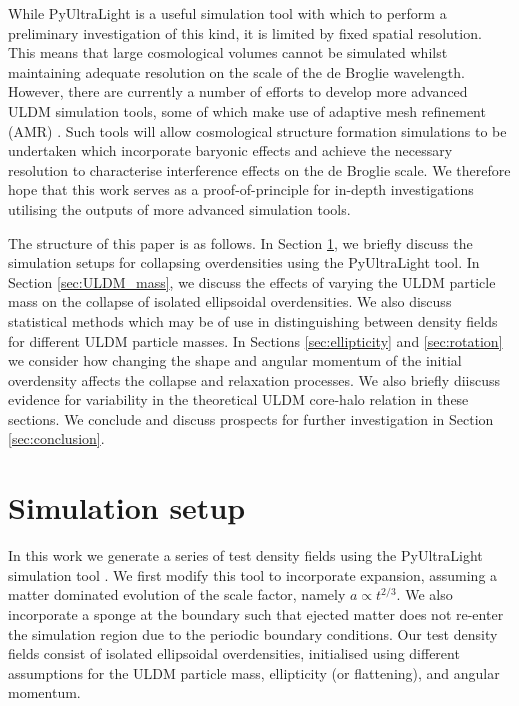 \documentclass[a4paper,11pt]{article}
\begin{document}
While {\sc PyUltraLight} is a useful simulation tool with which to perform a preliminary investigation of this kind, it is limited by fixed spatial resolution. This means that large cosmological volumes cannot be simulated whilst maintaining adequate resolution on the scale of the de Broglie wavelength. However, there are currently a number of efforts to develop more advanced ULDM simulation tools, some of which make use of adaptive mesh refinement (AMR) \cite{Mocz:2019emo, Niemeyer:2019aqm, Veltmaat:2019hou, Schwabe:2020eac}. Such tools will allow cosmological structure formation simulations to be undertaken which incorporate baryonic effects and achieve the necessary resolution to characterise interference effects on the de Broglie scale. We therefore hope that this work serves as a proof-of-principle for in-depth investigations utilising the outputs of more advanced simulation tools. 

The structure of this paper is as follows. In Section \ref{sec:sims}, we briefly discuss the simulation setups for collapsing overdensities using the {\sc PyUltraLight} tool. In Section \ref{sec:ULDM_mass}, we discuss the effects of varying the ULDM particle mass on the collapse of isolated ellipsoidal overdensities. We also discuss statistical methods which may be of use in distinguishing between density fields for different ULDM particle masses. In Sections \ref{sec:ellipticity} and \ref{sec:rotation} we consider how changing the shape and angular momentum of the initial overdensity affects the collapse and relaxation processes. We also briefly diiscuss evidence for variability in the theoretical ULDM core-halo relation in these sections. We conclude and discuss prospects for further investigation in Section \ref{sec:conclusion}.


\section{Simulation setup}\label{sec:sims}

In this work we generate a series of test density fields using the {\sc PyUltraLight} simulation tool \cite{Edwards:2018ccc}. We first modify this tool to incorporate expansion, assuming a matter dominated evolution of the scale factor, namely $a\propto t^{2/3}$. We also incorporate a sponge at the boundary such that ejected matter does not re-enter the simulation region due to the periodic boundary conditions. Our test density fields consist of isolated ellipsoidal overdensities, initialised using different assumptions for the ULDM particle mass, ellipticity (or flattening), and angular momentum. 
\end{document}
